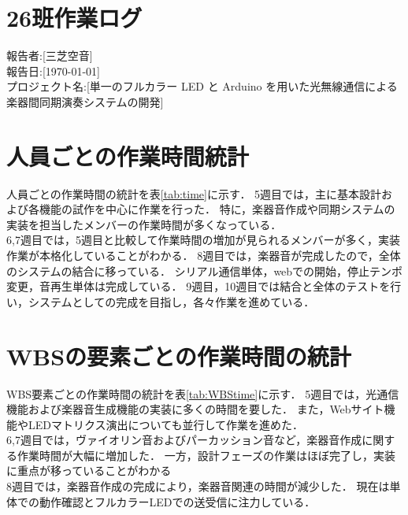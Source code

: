 \documentclass[uplatex,dvipdfmx]{jsarticle}
\begin{document}
\section{26班作業ログ}
報告者:[三芝空音]\\


報告日:[\today]\\


プロジェクト名:[単一のフルカラー LED と Arduino を用いた光無線通信による楽器間同期演奏システムの開発]\\


\section{人員ごとの作業時間統計}

人員ごとの作業時間の統計を表\ref{tab:time}に示す．
5週目では，主に基本設計および各機能の試作を中心に作業を行った．
特に，楽器音作成や同期システムの実装を担当したメンバーの作業時間が多くなっている．\\
6,7週目では，5週目と比較して作業時間の増加が見られるメンバーが多く，実装作業が本格化していることがわかる．
8週目では，楽器音が完成したので，全体のシステムの結合に移っている．
シリアル通信単体，webでの開始，停止テンポ変更，音再生単体は完成している．
9週目，10週目では結合と全体のテストを行い，システムとしての完成を目指し，各々作業を進めている．
\begin{table}[H]
  \centering
  \caption{人員ごとの作業時間統計}
  \label{tab:time}
  \renewcommand{\arraystretch}{1.2}
\end{table}



\section{WBSの要素ごとの作業時間の統計}
WBS要素ごとの作業時間の統計を表\ref{tab:WBStime}に示す．
5週目では，光通信機能および楽器音生成機能の実装に多くの時間を要した．
また，Webサイト機能やLEDマトリクス演出についても並行して作業を進めた．\\
6,7週目では，ヴァイオリン音およびパーカッション音など，楽器音作成に関する作業時間が大幅に増加した．
一方，設計フェーズの作業はほぼ完了し，実装に重点が移っていることがわかる\\
8週目では，楽器音作成の完成により，楽器音関連の時間が減少した．
現在は単体での動作確認とフルカラーLEDでの送受信に注力している．
\end{document}
